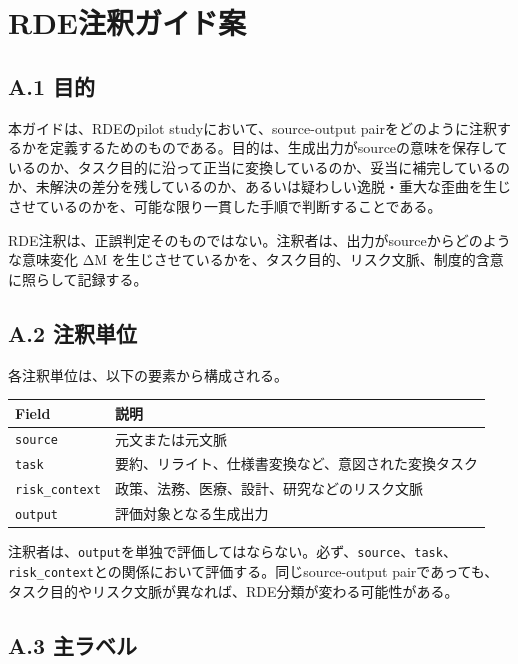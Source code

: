 \documentclass[
  a4paper]{ltjsarticle}
\begin{document}
\appendix
\section{RDE注釈ガイド案}\label{appendix-a-rde-annotation-guide}

\subsection{A.1 目的}\label{a.1-ux76eeux7684}

本ガイドは、RDEのpilot studyにおいて、source-output
pairをどのように注釈するかを定義するためのものである。目的は、生成出力がsourceの意味を保存しているのか、タスク目的に沿って正当に変換しているのか、妥当に補完しているのか、未解決の差分を残しているのか、あるいは疑わしい逸脱・重大な歪曲を生じさせているのかを、可能な限り一貫した手順で判断することである。

RDE注釈は、正誤判定そのものではない。注釈者は、出力がsourceからどのような意味変化
ΔM
を生じさせているかを、タスク目的、リスク文脈、制度的含意に照らして記録する。

\subsection{A.2 注釈単位}\label{a.2-ux6ce8ux91c8ux5358ux4f4d}

各注釈単位は、以下の要素から構成される。

\begin{longtable}[]{@{}ll@{}}
\toprule\noalign{}
Field & 説明 \\
\midrule\noalign{}
\endhead
\bottomrule\noalign{}
\endlastfoot
\texttt{source} & 元文または元文脈 \\
\texttt{task} & 要約、リライト、仕様書変換など、意図された変換タスク \\
\texttt{risk\_context} & 政策、法務、医療、設計、研究などのリスク文脈 \\
\texttt{output} & 評価対象となる生成出力 \\
\end{longtable}

注釈者は、\texttt{output}を単独で評価してはならない。必ず、\texttt{source}、\texttt{task}、\texttt{risk\_context}との関係において評価する。同じsource-output
pairであっても、タスク目的やリスク文脈が異なれば、RDE分類が変わる可能性がある。

\subsection{A.3 主ラベル}\label{a.3-primary-label}
\end{document}
